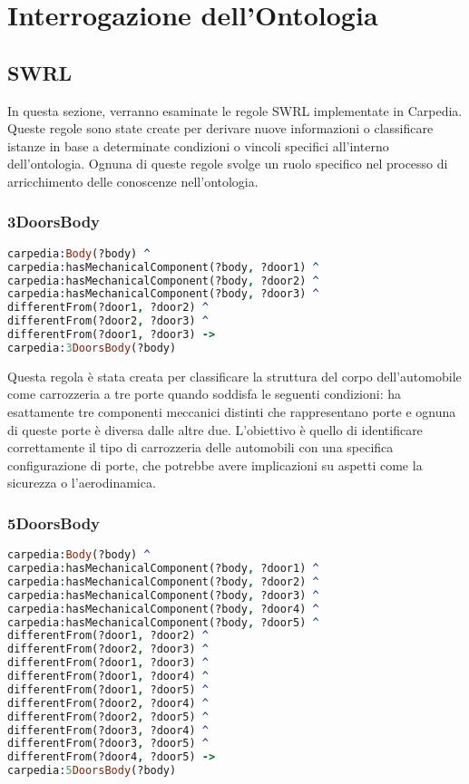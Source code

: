\chapter{Interrogazione dell'Ontologia}

\section{SWRL}\label{sec:swrl}
In questa sezione, verranno esaminate le regole SWRL implementate in Carpedia.
Queste regole sono state create per derivare nuove informazioni o classificare istanze in base a determinate
condizioni o vincoli specifici all'interno dell'ontologia.
Ognuna di queste regole svolge un ruolo specifico nel processo di arricchimento delle conoscenze nell'ontologia.

\subsection{3DoorsBody}

\begin{lstlisting}[language=Prolog]
carpedia:Body(?body) ^
carpedia:hasMechanicalComponent(?body, ?door1) ^
carpedia:hasMechanicalComponent(?body, ?door2) ^
carpedia:hasMechanicalComponent(?body, ?door3) ^
differentFrom(?door1, ?door2) ^
differentFrom(?door2, ?door3) ^
differentFrom(?door1, ?door3) ->
carpedia:3DoorsBody(?body)
\end{lstlisting}


Questa regola è stata creata per classificare la struttura del corpo dell'automobile come carrozzeria a tre porte quando
soddisfa le seguenti condizioni: ha esattamente tre componenti meccanici distinti che rappresentano porte e ognuna
di queste porte è diversa dalle altre due.
L'obiettivo è quello di identificare correttamente il tipo di carrozzeria delle automobili con una
specifica configurazione di porte, che potrebbe avere implicazioni su aspetti come la sicurezza o l'aerodinamica.

\subsection{5DoorsBody}

\begin{lstlisting}[language=Prolog]
carpedia:Body(?body) ^
carpedia:hasMechanicalComponent(?body, ?door1) ^
carpedia:hasMechanicalComponent(?body, ?door2) ^
carpedia:hasMechanicalComponent(?body, ?door3) ^
carpedia:hasMechanicalComponent(?body, ?door4) ^
carpedia:hasMechanicalComponent(?body, ?door5) ^
differentFrom(?door1, ?door2) ^
differentFrom(?door2, ?door3) ^
differentFrom(?door1, ?door3) ^
differentFrom(?door1, ?door4) ^
differentFrom(?door1, ?door5) ^
differentFrom(?door2, ?door4) ^
differentFrom(?door2, ?door5) ^
differentFrom(?door3, ?door4) ^
differentFrom(?door3, ?door5) ^
differentFrom(?door4, ?door5) ->
carpedia:5DoorsBody(?body)
\end{lstlisting}


